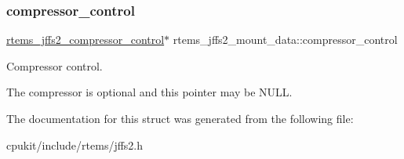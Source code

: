 \subsubsection{\texorpdfstring{compressor\_control}{compressor\_control}}
{\footnotesize\ttfamily \mbox{\hyperlink{structrtems__jffs2__compressor__control}{rtems\+\_\+jffs2\+\_\+compressor\+\_\+control}}$\ast$ rtems\+\_\+jffs2\+\_\+mount\+\_\+data\+::compressor\+\_\+control}



Compressor control. 

The compressor is optional and this pointer may be {\ttfamily N\+U\+LL}. 

The documentation for this struct was generated from the following file\+:\begin{DoxyCompactItemize}
\item 
cpukit/include/rtems/jffs2.\+h\end{DoxyCompactItemize}

